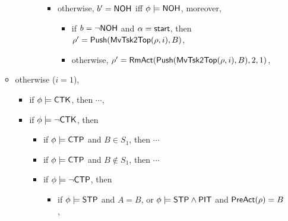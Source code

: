 \begin{itemize}
\begin{itemize}
\begin{itemize}
\begin{itemize}
\begin{itemize}
\begin{itemize}
                                \end{itemize}
                                \item otherwise, $b' = {\sf NOH}$ iff $\phi \models {\sf NOH}$, moreover, 
                                \begin{itemize}
                                    \item if $b = \neg {\sf NOH}$ and $\alpha = {\mathsf{start} }$, then $\rho'=\mathsf{Push}(\mathsf{MvTsk2Top}(\rho, i), B)$,
                                    \item otherwise, $\rho' = \mathsf{RmAct}(\mathsf{Push}(\mathsf{MvTsk2Top}(\rho, i), B), 2, 1)$, 
                                \end{itemize}
                           \end{itemize}
                \end{itemize}
        \end{itemize}
    \item otherwise ($i  = 1$),  
    \begin{itemize}
        \item if $\phi \models {\sf CTK}$, then $\cdots$, 
        \item if $\phi \models \neg {\sf CTK}$, then 
        \begin{itemize}
            \item if $\phi \models {\sf CTP}$ and $B \in S_1$, then $\cdots$
            \item if $\phi \models {\sf CTP}$ and $B\notin S_1$, then $\cdots$
            \item if $\phi \models \neg {\sf CTP}$, then
                \begin{itemize}
                    \item if $\phi\models{\sf STP}$ and $A = B$, or $\phi \models{\sf STP}\wedge{\sf PIT}$ and $\mathsf{PreAct}(\rho) = B$, 

\end{itemize}
\end{itemize}
\end{itemize}
\end{itemize}
\end{itemize}
